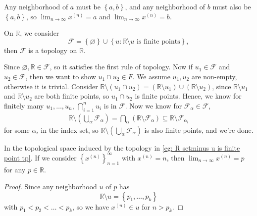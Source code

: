 \begin{explanation}
    Any neighborhood of \(a\) must be \(\left\{ a, b \right\} \), and any neighborhood of \(b\) must also be \(\left\{ a, b \right\} \), so \(\lim_{n \to \infty} x^{(n)} = a \) and \(\lim_{n \to \infty}  x^{(n)} = b\).     
\end{explanation}

\begin{eg} \label{eg: R setminus u is finite point tp}
    On \(\mathbb{R} \), we consider 
    \[
        \mathcal{F} = \left\{ \varnothing  \right\} \cup \left\{ u: \mathbb{R} \setminus  u \text{ is finite points} \right\},  
    \] then \(\mathcal{F} \) is a topology on \(\mathbb{R} \).   
\end{eg}
\begin{explanation}
    Since \(\varnothing, \mathbb{R}  \in \mathcal{F} \), so it satisfies the first rule of topology. Now if \(u_1 \in \mathcal{F} \) and \(u_2 \in \mathcal{F} \), then we want to show \(u_1 \cap u_2 \in F\). We assume \(u_1, u_2\) are non-empty, otherwise it is trivial. Consider \(\mathbb{R} \setminus \left( u_1 \cap u_2 \right) = \left( \mathbb{R} \setminus u_1 \right) \cup \left( \mathbb{R} \setminus u_2 \right)   \), since  \(\mathbb{R} \setminus u_1\) and \(\mathbb{R} \setminus u_2\) are both finite points, so \(u_1 \cap u_2\) is finite points. Hence, we know for finitely many \(u_1, \dots , u_n\), \(\bigcap_{i=1}^{n} u_i \) is in \(\mathcal{F} \). Now we know for \(\mathcal{F} _\alpha \in \mathcal{F} \), 
    \begin{align*}
        \mathbb{R} \setminus \left( \bigcup_{\alpha } \mathcal{F} _{\alpha }  \right) = \bigcap_{\alpha } \left( \mathbb{R} \setminus \mathcal{F} _{\alpha } \right) \subseteq \mathbb{R} \setminus \mathcal{F}_{\alpha _i}  
    \end{align*}           
    for some \(\alpha _i\) in the index set, so \(\mathbb{R} \setminus \left( \bigcup_{\alpha } \mathcal{F} _\alpha   \right) \) is also finite points, and we're done. 
\end{explanation}

\begin{remark}
    In the topological space induced by the topology in \autoref{eg: R setminus u is finite point tp}. If we consider \(\left\{ x^{(n)} \right\}_{n=1}^{\infty}  \) with \(x^{(n)} = n\), then \(\lim_{n \to \infty} x^{(n)} = p \) for any \(p \in \mathbb{R} \).     
\end{remark}
\begin{proof}
    Since any neighborhood \(u\) of \(p\) has
    \[
        \mathbb{R} \setminus u = \left\{ p_1, \dots , p_k \right\} 
    \] with \(p_1 < p_2 < \dots < p_k\), so we have \(x^{(n)} \in u\) for \(n > p_k\).  
\end{proof}